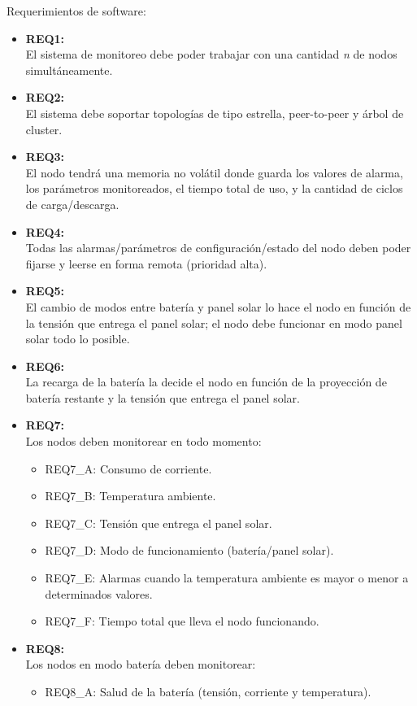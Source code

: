 \noindent Requerimientos de software:
\begin{itemize}
	\item \textbf{REQ1:}\\ El sistema de monitoreo debe poder trabajar con una cantidad \textit{n} de nodos simultáneamente.
	\item \textbf{REQ2:}\\ El sistema debe soportar topologías de tipo estrella, peer-to-peer y árbol de cluster.
	\item \textbf{REQ3:}\\ El nodo tendrá una memoria no volátil donde guarda los valores de alarma, los parámetros monitoreados, el tiempo total de uso, y la cantidad de ciclos de carga/descarga.
	\item \textbf{REQ4:}\\ Todas las alarmas/parámetros de configuración/estado del nodo deben poder fijarse y leerse en forma remota (prioridad alta).	
	\item \textbf{REQ5:}\\ El cambio de modos entre batería y panel solar lo hace el nodo en función de la tensión que entrega el panel solar; el nodo debe funcionar en modo panel solar todo lo posible.
	\item \textbf{REQ6:}\\ La recarga de la batería la decide el nodo en función de la proyección de batería restante y la tensión que entrega el panel solar.	
	\item \textbf{REQ7:}\\ Los nodos deben monitorear en todo momento:	
	\begin{itemize}
		\item REQ7\_A: Consumo de corriente.
		\item REQ7\_B: Temperatura ambiente.
		\item REQ7\_C: Tensión que entrega el panel solar.
		\item REQ7\_D: Modo de funcionamiento (batería/panel solar).
		\item REQ7\_E: Alarmas cuando la temperatura ambiente es mayor o menor a determinados valores.
		\item REQ7\_F: Tiempo total que lleva el nodo funcionando.
		\end{itemize}
	\item \textbf{REQ8:}\\Los nodos en modo batería deben monitorear:
		\begin{itemize}
		\item REQ8\_A: Salud de la batería (tensión, corriente y temperatura).

\end{itemize}
\end{itemize}
